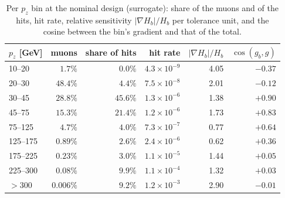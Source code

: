 \documentclass[11pt,a4paper]{article}
\begin{document}
\begin{table}[t]
\centering
\caption{Per $p_z$ bin at the nominal design (surrogate): share of the muons and of the hits, hit
rate, relative sensitivity $|\nabla H_b|/H_b$ per tolerance unit, and the cosine between the
bin's gradient and that of the total.}
\label{tab:pz}
\begin{tabular}{lrrrrr}
\toprule
$p_z$ [GeV] & muons & share of hits & hit rate & $|\nabla H_b|/H_b$ & $\cos(g_b, g)$ \\
\midrule
10--20   & $1.7\%$   & $0.0\%$  & $4.3\times10^{-9}$ & 4.05 & $-0.37$ \\
20--30   & $48.4\%$  & $4.4\%$  & $7.5\times10^{-8}$ & 2.01 & $-0.12$ \\
30--45   & $28.8\%$  & $45.6\%$ & $1.3\times10^{-6}$ & 1.38 & $+0.90$ \\
45--75   & $15.3\%$  & $21.4\%$ & $1.2\times10^{-6}$ & 1.73 & $+0.83$ \\
75--125  & $4.7\%$   & $4.0\%$  & $7.3\times10^{-7}$ & 0.77 & $+0.64$ \\
125--175 & $0.89\%$  & $2.6\%$  & $2.4\times10^{-6}$ & 0.62 & $+0.36$ \\
175--225 & $0.23\%$  & $3.0\%$  & $1.1\times10^{-5}$ & 1.44 & $+0.05$ \\
225--300 & $0.08\%$  & $9.9\%$  & $1.1\times10^{-4}$ & 1.32 & $+0.03$ \\
$>300$   & $0.006\%$ & $9.2\%$  & $1.2\times10^{-3}$ & 2.90 & $-0.01$ \\
\bottomrule
\end{tabular}
\end{table}
\end{document}
